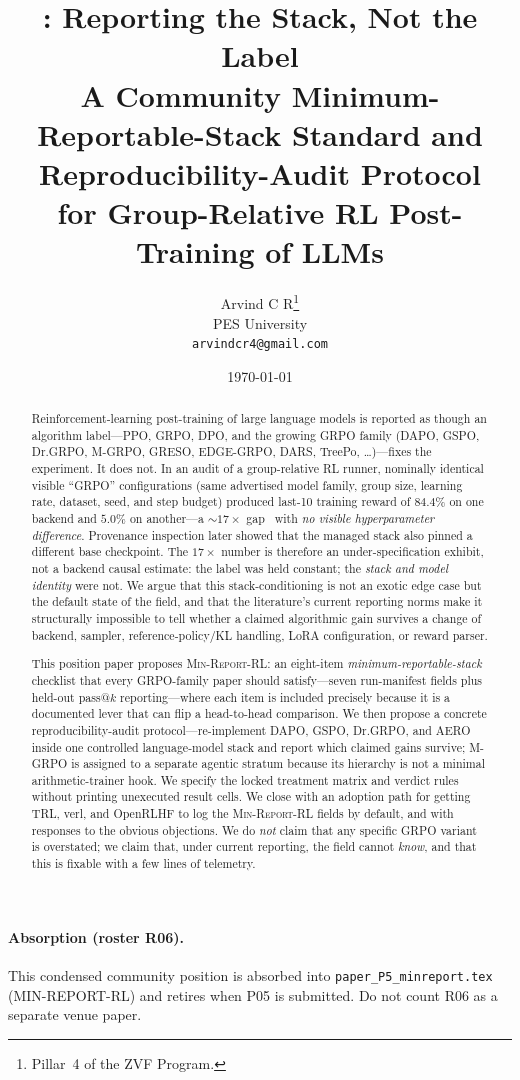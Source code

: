 \documentclass[11pt]{article}
\title{\minreport{}: Reporting the Stack, Not the Label\\
\large A Community Minimum-Reportable-Stack Standard and
Reproducibility-Audit Protocol\\for Group-Relative RL Post-Training of LLMs}
\author{Arvind C R\thanks{Pillar~4 of the ZVF Program.}\\
PES University\\\texttt{arvindcr4@gmail.com}}
\date{\today}
\newcommand{\minreport}{\textsc{Min-Report-RL}}
\begin{document}
\maketitle

\paragraph{Absorption (roster R06).}
This condensed community position is absorbed into
\texttt{paper\_P5\_minreport.tex} (MIN-REPORT-RL) and retires when P05 is
submitted. Do not count R06 as a separate venue paper.

\begin{abstract}
Reinforcement-learning post-training of large language models is reported as
though an algorithm label---PPO, GRPO, DPO, and the growing GRPO family
(DAPO, GSPO, Dr.GRPO, M-GRPO, GRESO, EDGE-GRPO, DARS, TreePo,
\ldots)---fixes the experiment. It does not.
In an audit of a group-relative RL runner, nominally identical visible
``GRPO'' configurations (same advertised model family, group size, learning rate, dataset,
seed, and step budget) produced last-10 training reward of $84.4\%$ on one
backend and $5.0\%$ on another---a $\sim 17\times$ gap~\citep{zvfaudit2026} with \emph{no visible
hyperparameter difference}. Provenance inspection later showed that the managed
stack also pinned a different base checkpoint. The $17\times$ number is therefore
an under-specification exhibit, not a backend causal estimate: the label was held
constant; the \emph{stack and model identity} were not. We argue that this
stack-conditioning is not an exotic edge case but the
default state of the field, and that the literature's current reporting norms
make it structurally impossible to tell whether a claimed algorithmic gain
survives a change of backend, sampler, reference-policy/KL handling, LoRA
configuration, or reward parser.

This position paper proposes \minreport{}: an eight-item
\emph{minimum-reportable-stack} checklist that every GRPO-family paper should
satisfy---seven run-manifest fields plus held-out pass@$k$ reporting---where
each item is included precisely because it is a documented
lever that can flip a head-to-head comparison. We then propose a concrete
reproducibility-audit protocol---re-implement DAPO, GSPO, Dr.GRPO, and AERO
inside one controlled language-model stack and report which claimed gains survive;
M-GRPO is assigned to a separate agentic stratum because its hierarchy is not a
minimal arithmetic-trainer hook. We specify the locked treatment matrix and
verdict rules without printing unexecuted result cells. We
close with an adoption path for getting TRL, verl, and OpenRLHF to log the
\minreport{} fields by default, and with responses to the obvious objections.
We do \emph{not} claim that any specific GRPO variant is overstated; we claim
that, under current reporting, the field cannot \emph{know}, and that this is
fixable with a few lines of telemetry.
\end{abstract}
\end{document}
